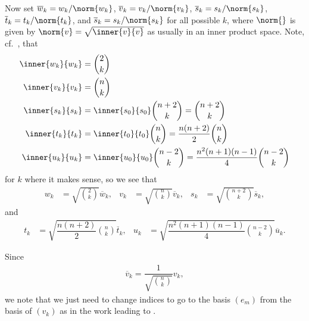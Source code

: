 Now set $\overline w_k = w_k/\norm{w_k}$, $\overline v_k = v_k/\norm{v_k}$, $\overline s_k = s_k/\norm{s_k}$, $\overline t_k = t_k/\norm{t_k}$, and $\overline s_k = s_k/\norm{s_k}$ for all possible $k$, where $\norm{}$ is given by $\norm{v}=\sqrt{\inner{v}{v}}$ as usually in an inner product space. Note, cf.\ , that
\begin{align}\label{eq:inprodres2}
  \begin{aligned}
    \inner{w_k}{w_k} &= \binom{2}{k} \\
    \inner{v_k}{v_k} &= \binom{n}{k} \\
    \inner{s_k}{s_k} &= \inner{s_0}{s_0}\binom{n+2}{k} = \binom{n+2}{k} \\
    \inner{t_k}{t_k} &= \inner{t_0}{t_0}\binom{n}{k} = \dfrac{n(n+2)}{2}\binom{n}{k} \\
    \inner{u_k}{u_k} &= \inner{u_0}{u_0}\binom{n-2}{k} = \dfrac{n^2(n+1)(n-1)}{4}\binom{n-2}{k}
  \end{aligned}
\end{align}
for $k$ where it makes sense, so we see that
\begin{align}\label{eq:normedbases1}
  w_k &= \sqrt{\binom{2}{k}}\overline w_k, & v_k &= \sqrt{\binom{n}{k}}\overline v_k, & s_k &= \sqrt{\binom{n+2}{k}}\overline s_k,
\end{align}
and
\begin{align}\label{eq:normedbases2}
  t_k &= \sqrt{\dfrac{n(n+2)}{2}\binom{n}{k}}\overline t_k, & u_k &= \sqrt{\dfrac{n^2(n+1)(n-1)}{4}\binom{n-2}{k}}\overline u_k.
\end{align}

\begin{remark}\label{rem:changeindex}
  Since
  \begin{align*}
    \overline v_k = \dfrac{1}{\sqrt{\binom{n}{k}}} v_k,
  \end{align*}
  we note that we just need to change indices to go to the basis $(e_m)$ from the basis of $(v_k)$ as in the work leading to .
\end{remark}

